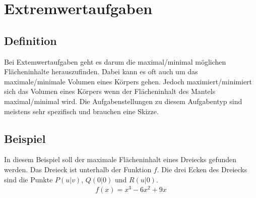 \chapter{Extremwertaufgaben}

\section{Definition}
\begin{flushleft}   
    Bei Extemwertaufgaben geht es darum die maximal/minimal möglichen Flächeninhalte herauszufinden.
    Dabei kann es oft auch um das maximale/minimale Volumen eines Körpers gehen.
    Jedoch maximiert/minimiert sich das Volumen eines Körpers wenn der Flächeninhalt des Mantels maximal/minimal wird.
    Die Aufgabenstellungen zu diesem Aufgabentyp sind meistens sehr spezifisch und brauchen eine Skizze.
\end{flushleft}

\section{Beispiel}
\begin{flushleft}
    In diesem Beispiel soll der maximale Flächeninhalt eines Dreiecks gefunden werden.
    Das Dreieck ist unterhalb der Funktion $f$.
    Die drei Ecken des Dreiecks sind die Punkte $P(u|v)$, $Q(0|0)$ und $R(u|0)$.
    \begin{align}
        f(x)=x^3-6x^2+9x
    \end{align}
\end{flushleft}

\begin{center}
\end{center}

